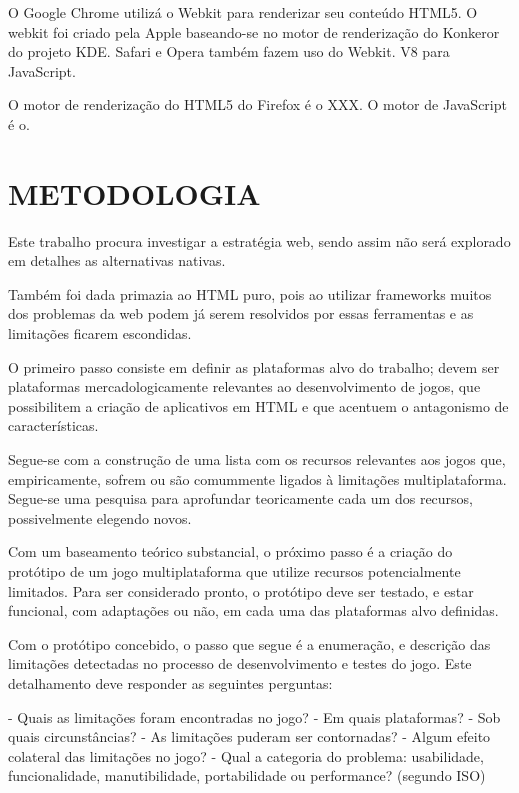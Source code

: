 \documentclass[11pt,a4paper]{article}
\begin{document}
O Google Chrome utilizá o Webkit para renderizar seu conteúdo HTML5. O
webkit foi criado pela Apple baseando-se no motor de renderização do
Konkeror do projeto KDE. Safari e Opera também fazem uso do Webkit. V8
para JavaScript.

O motor de renderização do HTML5 do Firefox é o XXX. O motor de
JavaScript é o.


\chapter{METODOLOGIA}

Este trabalho procura investigar a estratégia web, sendo assim não
será explorado em detalhes as alternativas nativas.

Também foi dada primazia ao HTML puro, pois ao utilizar frameworks
muitos dos problemas da web podem já serem resolvidos por essas
ferramentas e as limitações ficarem escondidas.


O primeiro passo consiste em definir as plataformas alvo do trabalho;
devem ser plataformas mercadologicamente relevantes ao desenvolvimento
de jogos, que possibilitem a criação de aplicativos em HTML e que
acentuem o antagonismo de características.

Segue-se com a construção de uma lista com os recursos relevantes
aos jogos que, empiricamente, sofrem ou são comummente ligados à
limitações multiplataforma. Segue-se uma pesquisa para aprofundar
teoricamente cada um dos recursos, possivelmente elegendo novos.

Com um baseamento teórico substancial, o próximo passo é a criação
do protótipo de um jogo multiplataforma que utilize recursos
potencialmente limitados. Para ser considerado pronto, o protótipo deve
ser testado, e estar funcional, com adaptações ou não, em cada uma
das plataformas alvo definidas.

Com o protótipo concebido, o passo que segue é a enumeração, e
descrição das limitações detectadas no processo de desenvolvimento e
testes do jogo. Este detalhamento deve responder as seguintes perguntas:

- Quais as limitações foram encontradas no jogo?
- Em quais plataformas?
- Sob quais circunstâncias?
- As limitações puderam ser contornadas?
- Algum efeito colateral das limitações no jogo?
- Qual a categoria do problema: usabilidade, funcionalidade,
manutibilidade, portabilidade ou performance? (segundo ISO) %

\end{document}

